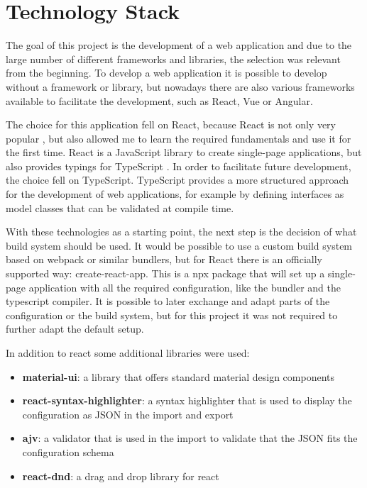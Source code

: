 \section{Technology Stack}
\label{sec:tech_stack}
The goal of this project is the development of a web application and due to the large number of different frameworks and libraries, the selection was relevant from the beginning. To develop a web application it is possible to develop without a framework or library, but nowadays there are also various frameworks available to facilitate the development, such as React, Vue or Angular.

The choice for this application fell on React, because React is not only very popular \cite{2020DeveloperSurvey}, but also allowed me to learn the required fundamentals and use it for the first time. React is a JavaScript library to create single-page applications, but also provides typings for TypeScript \cite{createReactApp}. In order to facilitate future development, the choice fell on TypeScript. TypeScript provides a more structured approach for the development of web applications, for example by defining interfaces as model classes that can be validated at compile time.

With these technologies as a starting point, the next step is the decision of what build system should be used. It would be possible to use a custom build system based on webpack or similar bundlers, but for React there is an officially supported way: create-react-app. This is a npx package that will set up a single-page application with all the required configuration, like the bundler and the typescript compiler. It is possible to later exchange and adapt parts of the configuration or the build system, but for this project it was not required to further adapt the default setup.

In addition to react some additional libraries were used:

\begin{itemize}
    \item \textbf{material-ui}: a library that offers standard material design components
    \item \textbf{react-syntax-highlighter}: a syntax highlighter that is used to display the configuration as JSON in the import and export 
    \item \textbf{ajv}: a validator that is used in the import to validate that the JSON fits the configuration schema
    \item \textbf{react-dnd}: a drag and drop library for react
\end{itemize}

\newpage